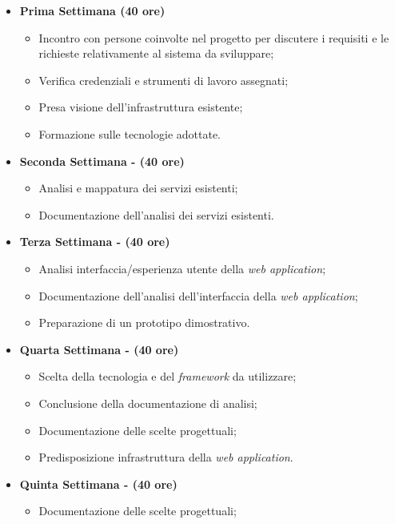 \begin{itemize}
    \item \textbf{Prima Settimana (40 ore)}
    \begin{itemize}
        \item Incontro con persone coinvolte nel progetto per discutere i requisiti e le richieste relativamente al sistema da sviluppare;
        \item Verifica credenziali e strumenti di lavoro assegnati;
        \item Presa visione dell’infrastruttura esistente;
        \item Formazione sulle tecnologie adottate.
    \end{itemize}
    \item \textbf{Seconda Settimana - (40 ore)} 
    \begin{itemize}
        \item Analisi e mappatura dei servizi  esistenti;
        \item Documentazione dell'analisi dei servizi  esistenti.
    \end{itemize}
    \item \textbf{Terza Settimana - (40 ore)} 
    \begin{itemize}
        \item Analisi interfaccia/esperienza utente della \textit{web application};
        \item Documentazione dell'analisi dell'interfaccia della \textit{web application};
        \item Preparazione di un prototipo dimostrativo.
    \end{itemize}
    \item \textbf{Quarta Settimana - (40 ore)} 
    \begin{itemize}
        \item Scelta della tecnologia e del \textit{framework} da utilizzare;
        \item Conclusione della documentazione di analisi;
        \item Documentazione delle scelte progettuali;
        \item Predisposizione infrastruttura della \textit{web application}.
    \end{itemize}
    \item \textbf{Quinta Settimana - (40 ore)} 
    \begin{itemize}
        \item Documentazione delle scelte progettuali;

\end{itemize}
\end{itemize}
